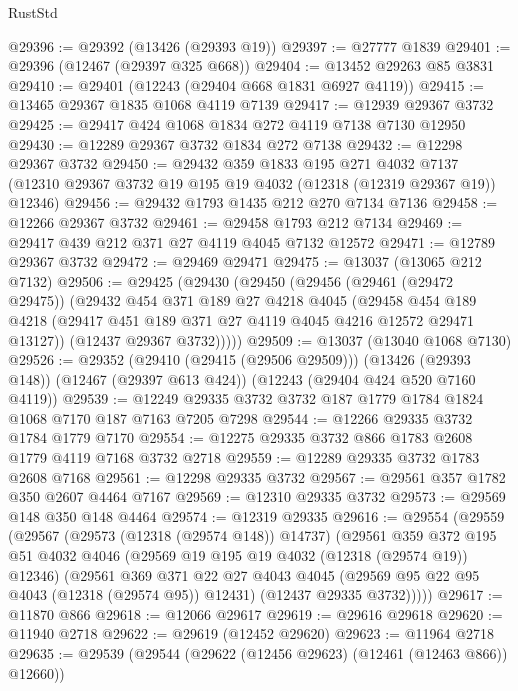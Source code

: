 \begin{lexlean}{RustStd}
\begin{coremodule}
@29396 := @29392 (@13426 (@29393 @19))
@29397 := @27777 @1839
@29401 := @29396 (@12467 (@29397 @325 @668))
@29404 := @13452 @29263 @85 @3831
@29410 := @29401 (@12243 (@29404 @668 @1831 @6927 @4119))
@29415 := @13465 @29367 @1835 @1068 @4119 @7139
@29417 := @12939 @29367 @3732
@29425 := @29417 @424 @1068 @1834 @272 @4119 @7138 @7130 @12950
@29430 := @12289 @29367 @3732 @1834 @272 @7138
@29432 := @12298 @29367 @3732
@29450 := @29432
    @359
    @1833
    @195
    @271
    @4032
    @7137
    (@12310 @29367 @3732 @19 @195 @19 @4032 (@12318 (@12319 @29367 @19)) @12346)
@29456 := @29432 @1793 @1435 @212 @270 @7134 @7136
@29458 := @12266 @29367 @3732
@29461 := @29458 @1793 @212 @7134
@29469 := @29417 @439 @212 @371 @27 @4119 @4045 @7132 @12572
@29471 := @12789 @29367 @3732
@29472 := @29469 @29471
@29475 := @13037 (@13065 @212 @7132)
@29506 := @29425
    (@29430
      (@29450
        (@29456
          (@29461 (@29472 @29475))
          (@29432
            @454
            @371
            @189
            @27
            @4218
            @4045
            (@29458
              @454
              @189
              @4218
              (@29417 @451 @189 @371 @27 @4119 @4045 @4216 @12572 @29471 @13127))
            (@12437 @29367 @3732)))))
@29509 := @13037 (@13040 @1068 @7130)
@29526 := @29352
    (@29410 (@29415 (@29506 @29509)))
    (@13426 (@29393 @148))
    (@12467 (@29397 @613 @424))
    (@12243 (@29404 @424 @520 @7160 @4119))
@29539 := @12249 @29335 @3732 @3732 @187 @1779 @1784 @1824 @1068 @7170 @187 @7163 @7205 @7298
@29544 := @12266 @29335 @3732 @1784 @1779 @7170
@29554 := @12275 @29335 @3732 @866 @1783 @2608 @1779 @4119 @7168 @3732 @2718
@29559 := @12289 @29335 @3732 @1783 @2608 @7168
@29561 := @12298 @29335 @3732
@29567 := @29561 @357 @1782 @350 @2607 @4464 @7167
@29569 := @12310 @29335 @3732
@29573 := @29569 @148 @350 @148 @4464
@29574 := @12319 @29335
@29616 := @29554
    (@29559
      (@29567
        (@29573 (@12318 (@29574 @148)) @14737)
        (@29561
          @359
          @372
          @195
          @51
          @4032
          @4046
          (@29569 @19 @195 @19 @4032 (@12318 (@29574 @19)) @12346)
          (@29561
            @369
            @371
            @22
            @27
            @4043
            @4045
            (@29569 @95 @22 @95 @4043 (@12318 (@29574 @95)) @12431)
            (@12437 @29335 @3732)))))
@29617 := @11870 @866
@29618 := @12066 @29617
@29619 := @29616 @29618
@29620 := @11940 @2718
@29622 := @29619 (@12452 @29620)
@29623 := @11964 @2718
@29635 := @29539
    (@29544 (@29622 (@12456 @29623) (@12461 (@12463 @866)) @12660))

\end{coremodule}
\end{lexlean}
